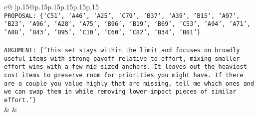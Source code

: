 \documentclass{article}
\begin{document}
{\begin{supertabular}{c@{$\;$}|p{.15\linewidth}@{}p{.15\linewidth}p{.15\linewidth}p{.15\linewidth}p{.15\linewidth}p{.15\linewidth}}
{{{\\ 
\texttt{PROPOSAL: \{'C51', 'A46', 'A25', 'C79', 'B37', 'A39', 'B15', 'A97', 'B23', 'A96', 'A28', 'A75', 'B96', 'B19', 'B69', 'C53', 'A94', 'A71', 'A88', 'B43', 'B95', 'C10', 'C60', 'C82', 'B34', 'B81'\}} \\
\\ 
\texttt{ARGUMENT: \{'This set stays within the limit and focuses on broadly useful items with strong payoff relative to effort, mixing smaller{-}effort wins with a few mid{-}sized anchors. It leaves out the heaviest{-}cost items to preserve room for priorities you might have. If there are a couple you value highly that are missing, tell me which ones and we can swap them in while removing lower{-}impact pieces of similar effort.'\}} \\
            }
        }
    }
    & & \\ \\


\end{supertabular}}
\end{document}
